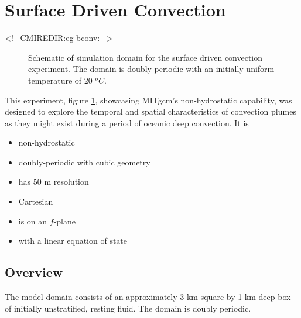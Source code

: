 \section{Surface Driven Convection}
\label{www:tutorials}
\label{sect:eg-bconv}
\begin{rawhtml}
<!-- CMIREDIR:eg-bconv: -->
\end{rawhtml}


%
%

\begin{figure}
\begin{center}
\end{center}
\caption{Schematic of simulation domain 
for the surface driven convection experiment. The domain is doubly periodic
with an initially uniform temperature of 20 $^oC$. 
}
\label{FIG:eg-bconv-simulation_config}
\end{figure}

This experiment, figure \ref{FIG:eg-bconv-simulation_config}, showcasing MITgcm's non-hydrostatic capability, was designed to explore 
the temporal and spatial characteristics of convection plumes as they might exist during a 
period of oceanic deep convection. It is

\begin{itemize}
\item non-hydrostatic 
\item doubly-periodic with cubic geometry
\item has 50 m resolution 
\item Cartesian  
\item is on an $f$-plane 
\item with a linear equation of state 
\end{itemize}

\subsection{Overview}
\label{www:tutorials}

The model domain consists of an approximately 3
km square by 1 km deep box of initially
unstratified, resting fluid. The domain is doubly periodic. 

